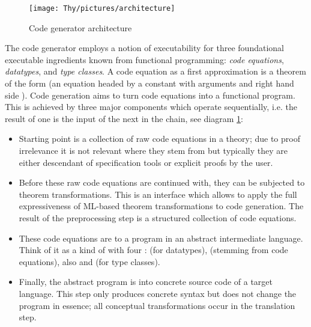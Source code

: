 \begin{isabellebody}
\begin{isamarkuptext}
  \begin{figure}[h]
    \texttt{[image: Thy/pictures/architecture]}
    \caption{Code generator architecture}
    \label{fig:arch}
  \end{figure}

  The code generator employs a notion of executability
  for three foundational executable ingredients known
  from functional programming:
  \emph{code equations}, \emph{datatypes}, and
  \emph{type classes}.  A code equation as a first approximation
  is a theorem of the form 
  (an equation headed by a constant  with arguments
   and right hand side ).
  Code generation aims to turn code equations
  into a functional program.  This is achieved by three major
  components which operate sequentially, i.e. the result of one is
  the input
  of the next in the chain,  see diagram \ref{fig:arch}:

  \begin{itemize}

    \item Starting point is a collection of raw code equations in a
      theory; due to proof irrelevance it is not relevant where they
      stem from but typically they are either descendant of specification
      tools or explicit proofs by the user.
      
    \item Before these raw code equations are continued
      with, they can be subjected to theorem transformations.  This
       is an interface which allows to apply the full
      expressiveness of ML-based theorem transformations to code
      generation.  The result of the preprocessing step is a
      structured collection of code equations.

    \item These code equations are  to a program in an
      abstract intermediate language.  Think of it as a kind
      of  with four : 
      (for datatypes),  (stemming from code equations),
      also  and  (for type classes).

    \item Finally, the abstract program is  into concrete
      source code of a target language.
      This step only produces concrete syntax but does not change the
      program in essence; all conceptual transformations occur in the
      translation step.


\end{itemize}
\end{isamarkuptext}
\end{isabellebody}
